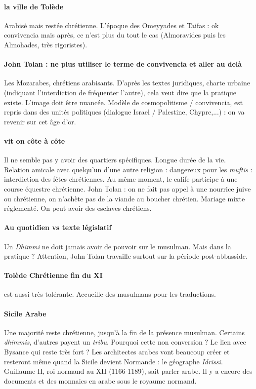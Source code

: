 \paragraph{la ville de Tolède} Arabisé mais restée chrétienne.  L'époque des Omeyyades et Taifas : ok convivencia mais après, ce n'est plus du tout le cas (Almoravides puis les Almohades, très rigoristes).

\paragraph{John Tolan : ne plus utiliser le terme de convivencia et aller au delà} Les Mozarabes, chrétiens arabisants. D'après les textes juridiques, charte urbaine (indiquant l'interdiction de fréquenter l'autre), cela veut dire que la pratique existe. L'image doit être nuancée. Modèle de cosmopolitisme / convivencia, est repris dans des unités politiques (dialogue Israel / Palestine, Chypre,...) : on va revenir sur cet âge d'or. 


\paragraph{vit on côte à côte} Il ne semble pas y avoir des quartiers spécifiques. Longue durée de la vie. Relation amicale avec quelqu'un d'une autre religion : dangereux pour les \textit{muftis} : interdiction des fêtes chrétiennes. Au même moment, le calife participe à une course équestre chrétienne. 
John Tolan : on ne fait pas appel à une nourrice juive ou chrétienne, on n'achète pas de la viande au boucher chrétien. Mariage mixte réglementé. On peut avoir des esclaves chrétiens.


\paragraph{Au quotidien vs texte législatif} Un \textit{Dhimmi} ne doit jamais avoir de pouvoir sur le musulman. Mais dans la pratique ? Attention, John Tolan travaille surtout sur la période post-abbasside. 

\paragraph{Tolède Chrétienne fin du XI} est aussi très tolérante. Accueille des musulmans pour les traductions.


\paragraph{Sicile Arabe} Une majorité reste chrétienne, jusqu'à la fin de la présence musulman. Certains \textit{dhimmis}, d'autres payent un \textit{tribu}. Pourquoi cette non conversion ? Le lien avec Bysance qui reste très fort ? Les architectes arabes vont beaucoup créer et resteront même quand la Sicile devient Normande : le géographe \textit{Idrissi}. Guillaume II, roi normand au XII (1166-1189), sait parler arabe. Il y a encore des documents et des monnaies en arabe sous le royaume normand.

